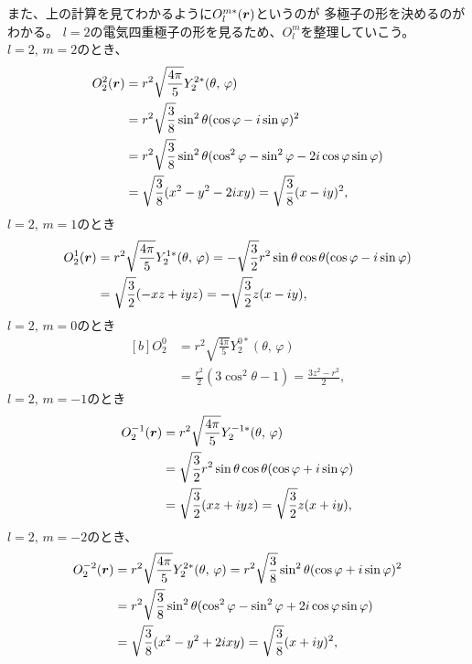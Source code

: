 \documentclass[../../master.tex]{subfiles}
\begin{document}
また、上の計算を見てわかるように\(O_l^{m*}(\vb*{r})\)というのが
多極子の形を決めるのがわかる。
\(l=2\)の電気四重極子の形を見るため、\(O_l^m\)を整理していこう。
\(l=2,\,m=2\)のとき、
\begin{equation}\begin{aligned}[b]
    O_2^{2}(\vb*{r})
    &= r^2\sqrt{\frac{4\pi}{5}}Y_2^{2*}(\theta,\,\varphi)\\
    &= r^2\sqrt{\frac{3}{8}} \sin^2\theta(\cos\varphi - i\sin\varphi)^2\\
    &= r^2\sqrt{\frac{3}{8}}\sin^2\theta(\cos^2\varphi-\sin^2\varphi - 2i\cos\varphi\sin\varphi)\\
    &=\sqrt{\frac{3}{8}}(x^2-y^2-2ixy)
    =\sqrt{\frac{3}{8}}(x-iy)^2,
\end{aligned}\end{equation}
\(l=2,\,m=1\)のとき
\begin{equation}\begin{aligned}[b]
    O_2^{1}(\vb*{r})
    &= r^2 \sqrt{\frac{4\pi}{5}}Y_2^{1*}(\theta,\,\varphi)
    = -\sqrt{\frac{3}{2}}r^2\sin\theta\cos\theta (\cos\varphi - i\sin\varphi)\\
    &= \sqrt{\frac{3}{2}}(-xz+iyz) = -\sqrt{\frac{3}{2}}z(x-iy),
\end{aligned}\end{equation}
\(l=2,\,m=0\)のとき
\begin{equation}\begin{aligned}[b]
    O_2^{0}
    &= r^2 \sqrt{\frac{4\pi}{5}}Y_2^{0*}(\theta,\,\varphi)\\
    &= \frac{r^2}{2}(3\cos^2\theta-1) = \frac{3z^2-r^2}{2},
\end{aligned}\end{equation}
\(l=2,\,m=-1\)のとき
\begin{equation}\begin{aligned}[b]
    O_2^{-1}(\vb*{r})
    &= r^2 \sqrt{\frac{4\pi}{5}}Y_2^{-1*}(\theta,\,\varphi)\\
    &= \sqrt{\frac{3}{2}}r^2\sin\theta\cos\theta (\cos\varphi + i\sin\varphi)\\
    &= \sqrt{\frac{3}{2}}(xz+iyz) = \sqrt{\frac{3}{2}}z(x+iy),
\end{aligned}\end{equation}
\(l=2,\,m=-2\)のとき、
\begin{equation}\begin{aligned}[b]
    O_2^{-2}(\vb*{r})
    &= r^2\sqrt{\frac{4\pi}{5}}Y_2^{2*}(\theta,\,\varphi)
    = r^2\sqrt{\frac{3}{8}} \sin^2\theta(\cos\varphi + i\sin\varphi)^2\\
    &= r^2\sqrt{\frac{3}{8}} \sin^2\theta(\cos^2\varphi-\sin^2\varphi + 2i\cos\varphi\sin\varphi)\\
    &=\sqrt{\frac{3}{8}}(x^2-y^2+2ixy) = \sqrt{\frac{3}{8}}(x+iy)^2,
\end{aligned}\end{equation}
\end{document}
